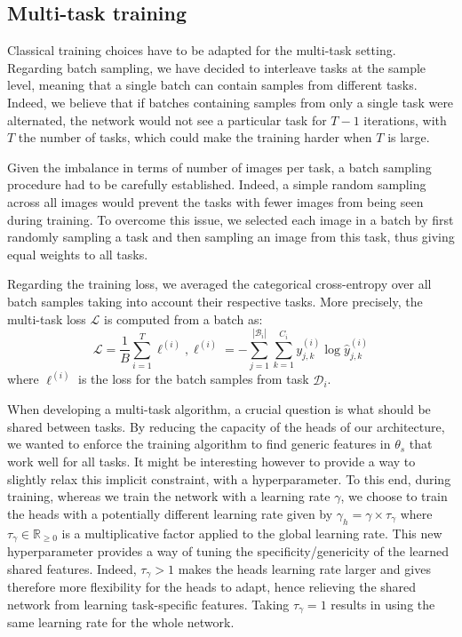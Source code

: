 \subsection{Multi-task training}
\label{ssec:mtask:multitask-training}

Classical training choices have to be adapted for the multi-task setting. Regarding batch sampling, we have decided to interleave tasks at the sample level, meaning that a single batch can contain samples from different tasks. Indeed, we believe that if batches containing samples from only a single task were alternated, the network would not see a particular task for $T-1$ iterations, with $T$ the number of tasks, which could make the training harder when $T$ is large.

Given the imbalance in terms of number of images per task, a batch sampling procedure had to be carefully established. Indeed, a simple random sampling across all images would prevent the tasks with fewer images from being seen during training. To overcome this issue, we selected each image in a batch by first randomly sampling a task and then sampling an image from this task, thus giving equal weights to all tasks.

Regarding the training loss, we averaged the categorical cross-entropy over all batch samples taking into account their respective tasks. More precisely, the multi-task loss $\mathcal{L}$ is computed from a batch as:
\begin{equation}\label{eqn:loss}
\mathcal{L} = \frac{1}{B} \sum_{i=1}^T \ell^{(i)}, \ell^{(i)} = - \sum_{j=1}^{\left|\mathcal{B}_{i}\right|} \sum_{k=1}^{C_{i}} y^{(i)}_{j,k} \log \hat{y}^{(i)}_{j,k}
\end{equation}
where $\ell^{(i)}$ is the loss for the batch samples from task $\mathcal{D}_i$.

When developing a multi-task algorithm, a crucial question is what should be shared between tasks. By reducing the capacity of the heads of our architecture, we wanted to enforce the training algorithm to find generic features in $\theta_s$ that work well for all tasks. It might be interesting however to provide a way to slightly relax this implicit constraint, with a hyperparameter. To this end, during training, whereas we train the network with a learning rate $\gamma$, we choose to train the heads with a potentially different learning rate given by $\gamma_h = \gamma \times \tau_\gamma$ where $\tau_\gamma \in \mathbb{R}_{\geq0}$ is a multiplicative factor applied to the global learning rate. This new hyperparameter provides a way of tuning the specificity/genericity of the learned shared features.  Indeed, $\tau_\gamma > 1$ makes the heads learning rate larger and gives therefore more flexibility for the heads to adapt, hence relieving the shared network from learning task-specific features. Taking $\tau_\gamma = 1$ results in using the same learning rate for the whole network.

